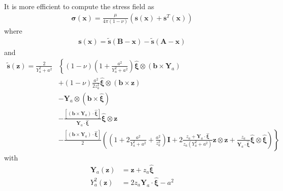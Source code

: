 It is more efficient to compute the stress field as
\begin{align}
\bm\sigma(\bm x)=\frac{\mu}{4\pi(1-\nu)}\left(\bm s(\bm x)+\bm s^T(\bm x)\right)
\end{align}
where
\begin{align}
\bm s(\bm x)=\tilde {\bm s}(\bm B-\bm x)-\tilde {\bm s}(\bm A-\bm x)
\end{align}
and
\begin{align}
\tilde{\bm s}(\bm z)
=\frac{2}{Y_a^2+a^2}&
\left\{
(1-\nu)\left(1+\frac{a^2}{Y_a^2+a^2}\right)\hat{\bm\xi}\otimes\left(\bm b\times \bm Y_a\right)\right.\nonumber\\
&+(1-\nu)\frac{a^2}{2z_a^2 }\hat{\bm\xi}\otimes\left(\bm b\times \bm z\right)\nonumber\\
&-\bm Y_a\otimes\left(\bm b\times\hat{\bm \xi}\right)\nonumber\\
&-\frac{\left[\left(\bm b\times\bm Y_a\right)\cdot\hat{\bm \xi}\right]}{\bm Y_a\cdot \hat{\bm \xi}}\hat{\bm\xi}\otimes\bm z\nonumber\\
&\left.-\frac{\left[\left(\bm b\times\bm Y_a\right)\cdot\hat{\bm \xi}\right]}{2}\left(\left(1+2\frac{a^2}{Y_a^2+a^2}+\frac{a^2}{z_a^2 }\right)\bm I+2\frac{z_a+\bm Y_a\cdot \hat{\bm \xi}}{z_a(Y_a^2+a^2)}\bm z\otimes\bm z+\frac{z_a}{\bm Y_a\cdot \hat{\bm \xi}}\hat{\bm\xi}\otimes\hat{\bm\xi}\right)\right\}%
\end{align}
with
\begin{align}
\bm Y_a(\bm z)&=\bm z+z_a\hat{\bm\xi}\\
 Y^2_a(\bm z)&=2z_a\bm Y_a\cdot\hat{\bm \xi}-a^2\\
\end{align}

